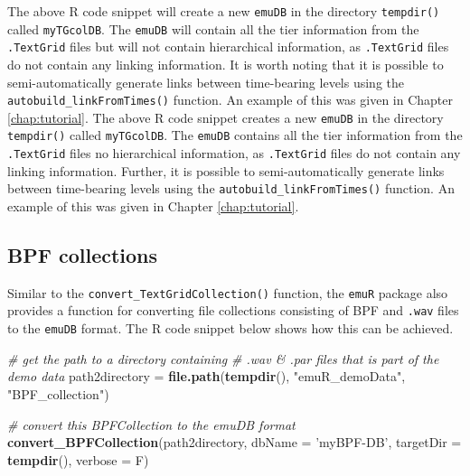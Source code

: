 \documentclass[]{book}
\newenvironment{Shaded}{\begin{snugshade}}{\end{snugshade}}
\newcommand{\CommentTok}[1]{\textcolor[rgb]{0.56,0.35,0.01}{\textit{#1}}}
\newcommand{\DataTypeTok}[1]{\textcolor[rgb]{0.13,0.29,0.53}{#1}}
\newcommand{\KeywordTok}[1]{\textcolor[rgb]{0.13,0.29,0.53}{\textbf{#1}}}
\newcommand{\NormalTok}[1]{#1}
\newcommand{\StringTok}[1]{\textcolor[rgb]{0.31,0.60,0.02}{#1}}
\begin{document}
The above R code snippet will create a new \texttt{emuDB} in the directory \texttt{tempdir()} called \texttt{myTGcolDB}. The \texttt{emuDB} will contain all the tier information from the \texttt{.TextGrid} files but will not contain hierarchical information, as \texttt{.TextGrid} files do not contain any linking information. It is worth noting that it is possible to semi-automatically generate links between time-bearing levels using the \texttt{autobuild\_linkFromTimes()} function. An example of this was given in Chapter \ref{chap:tutorial}.
The above R code snippet creates a new \texttt{emuDB} in the directory \texttt{tempdir()} called \texttt{myTGcolDB}. The \texttt{emuDB} contains all the tier information from the \texttt{.TextGrid} files no hierarchical information, as \texttt{.TextGrid} files do not contain any linking information. Further, it is possible to semi-automatically generate links between time-bearing levels using the \texttt{autobuild\_linkFromTimes()} function. An example of this was given in Chapter \ref{chap:tutorial}.

\hypertarget{bpf-collections}{%
\subsection{BPF collections}\label{bpf-collections}}

Similar to the \texttt{convert\_TextGridCollection()} function, the \texttt{emuR} package also provides a function for converting file collections consisting of BPF and \texttt{.wav} files to the \texttt{emuDB} format. The R code snippet below shows how this can be achieved.

\begin{Shaded}
\begin{Highlighting}[]
\CommentTok{# get the path to a directory containing}
\CommentTok{# .wav & .par files that is part of the demo data}
\NormalTok{path2directory =}\StringTok{ }\KeywordTok{file.path}\NormalTok{(}\KeywordTok{tempdir}\NormalTok{(),}
                           \StringTok{"emuR_demoData"}\NormalTok{,}
                           \StringTok{"BPF_collection"}\NormalTok{)}

\CommentTok{# convert this BPFCollection to the emuDB format}
\KeywordTok{convert_BPFCollection}\NormalTok{(path2directory, }\DataTypeTok{dbName =} \StringTok{'myBPF-DB'}\NormalTok{,}
                      \DataTypeTok{targetDir =} \KeywordTok{tempdir}\NormalTok{(), }\DataTypeTok{verbose =}\NormalTok{ F)}
\end{Highlighting}
\end{Shaded}
\end{document}

